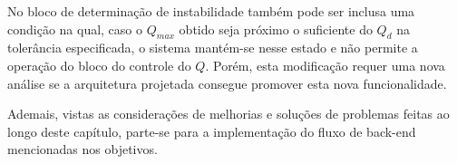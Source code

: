 No bloco de determinação de instabilidade também pode ser inclusa uma condição na qual, caso o $Q_{max}$ obtido seja próximo o suficiente do $Q_d$ na tolerância especificada, o sistema mantém-se nesse estado e não permite a operação do bloco do controle do $Q$. Porém, esta modificação requer uma nova análise se a arquitetura projetada consegue promover esta nova funcionalidade.

Ademais, vistas as considerações de melhorias e soluções de problemas feitas ao longo deste capítulo, parte-se para a implementação do fluxo de back-end mencionadas nos objetivos.






% 
% 
% 
% 
% 
% 


\postextual



% 

\printindex



